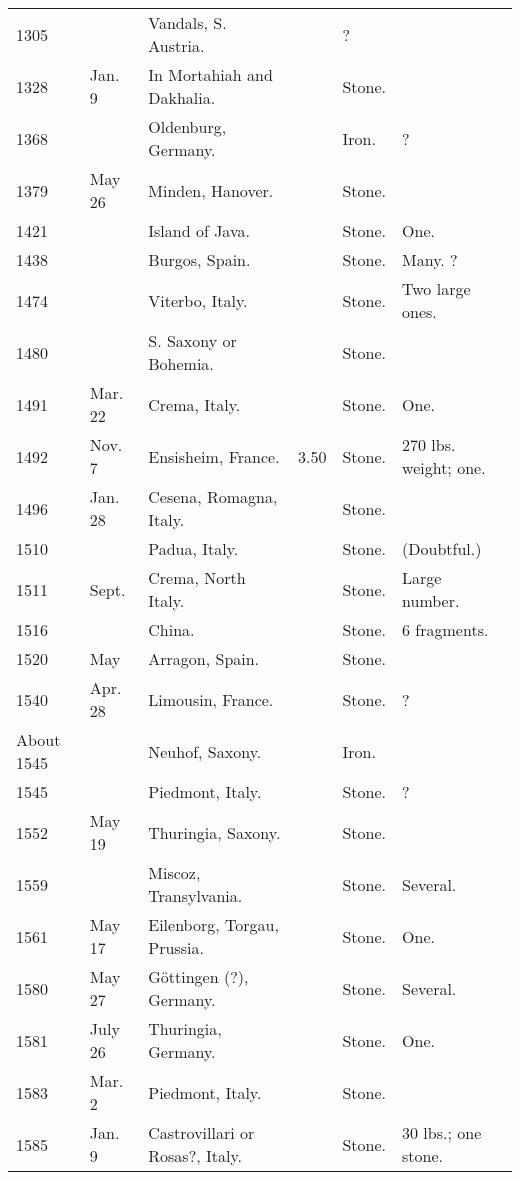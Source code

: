 \documentclass[a4paper, 12pt, oneside]{article}
\begin{document}
\begin{center}
\begin{longtable}{|p{10mm}|p{15mm}|p{32mm}|p{13mm}|p{13mm}|p{26mm}|}
        1305 & ~ & Vandals, S. Austria. & ~ & ? & ~ \\
        1328 & Jan. 9 & In Mortahiah and Dakhalia. & ~ & Stone. & ~ \\
        1368 & ~ & Oldenburg, Germany. & ~ & Iron. & ? \\
        1379 & May 26 & Minden, Hanover. & ~ & Stone. & ~ \\
        1421 & ~ & Island of Java. & ~ & Stone. & One. \\
        1438 & ~ & Burgos, Spain. & ~ & Stone. & Many. ? \\
        1474 & ~ & Viterbo, Italy. & ~ & Stone. & Two large ones. \\
        1480 & ~ & S. Saxony or Bohemia. & ~ & Stone. & ~ \\
        1491 & Mar. 22 & Crema, Italy. & ~ & Stone. & One. \\
        1492 & Nov. 7 & Ensisheim, France. & 3.50 & Stone. & 270 lbs. weight; one. \\
        1496 & Jan. 28 & Cesena, Romagna, Italy. & ~ & Stone. & ~ \\
        1510 & ~ & Padua, Italy. & ~ & Stone. & (Doubtful.) \\
        1511 & Sept. & Crema, North Italy. & ~ & Stone. & Large number. \\
        1516 & ~ & China. & ~ & Stone. & 6 fragments. \\
        1520 & May & Arragon, Spain. & ~ & Stone. & ~ \\
        1540 & Apr. 28 & Limousin, France. & ~ & Stone. & ? \\
        About 1545 & ~ & Neuhof, Saxony. & ~ & Iron. & ~ \\
        1545 & ~ & Piedmont, Italy. & ~ & Stone. & ? \\
        1552 & May 19 & Thuringia, Saxony. & ~ & Stone. & ~ \\
        1559 & ~ & Miscoz, Transylvania. & ~ & Stone. & Several. \\
        1561 & May 17 & Eilenborg, Torgau, Prussia. & ~ & Stone. & One. \\
        1580 & May 27 & Göttingen (?), Germany. & ~ & Stone. & Several. \\
        1581 & July 26 & Thuringia, Germany. & ~ & Stone. & One. \\
        1583 & Mar. 2 & Piedmont, Italy. & ~ & Stone. & ~ \\
        1585 & Jan. 9 & Castrovillari or Rosas?, Italy. & ~ & Stone. & 30 lbs.; one stone. \\

\end{longtable}
\end{center}
\end{document}
